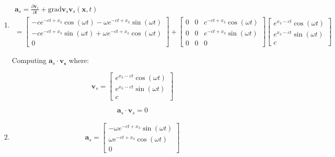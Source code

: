 \begin{problem}
    \noindent
    \normalfont

   \begin{enumerate}
    \item 
    
    \begin{align}
    \mathbf{a}_{s}=\frac{ \partial \mathbf{v}_{s} }{ \partial t } + \text{grad}\mathbf{v}_{s}\mathbf{v}_{s}(\mathbf{x}, t) \\
    = \begin{bmatrix}
    -ce^{-ct+x_{3}}\cos(\omega t)-\omega e^{-ct+x_{3}}\sin(\omega t) \\
    -ce^{-ct+x_{3}}\sin(\omega t)+\omega e^{-ct+x_{3}}\cos(\omega t) \\
    0
    \end{bmatrix}+\begin{bmatrix}
    0 & 0 & c^{-ct+x_{3}}\cos(\omega t) \\
    0 & 0 & e^{-ct+x_{3}}\sin(\omega t) \\
    0 & 0 & 0
    \end{bmatrix}\begin{bmatrix}
    e^{x_{3}-ct}\cos(\omega t) \\
    e^{x_{3}-ct}\sin(\omega t) \\
    c
    \end{bmatrix}
    \end{align}
    
    
    Computing $\mathbf{a}_{s}\cdot \mathbf{v_{s}}$ where:
    
    $$
    \mathbf{v}_{s}=\begin{bmatrix}
    e^{x_{3}-ct}\cos(\omega t) \\
    e^{x_{3}-ct}\sin(\omega t) \\
    c
    \end{bmatrix}
    $$
    
    $$
    \mathbf{a}_{s}\cdot \mathbf{v}_{s}=0
    $$
    
    \item 
    \begin{align}
        \mathbf{a}_{s}= \begin{bmatrix}
        -\omega e^{-ct+x_{3}}\sin(\omega t) \\
        \omega e^{-ct+x_{3}}\cos(\omega t) \\
        0
        \end{bmatrix}
        \end{align}


\end{enumerate}
\end{problem}
